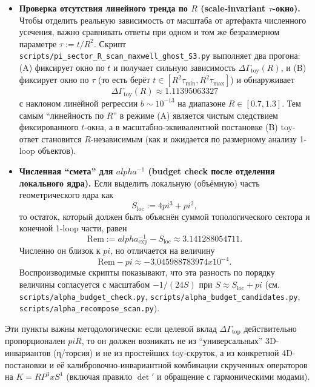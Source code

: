 \documentclass[12pt]{article}
\def\mathbb#1{#1}%
\def\alpha{alpha}%
\def\pi{pi}%
\def\times{x}%
\begin{document}
\begin{itemize}
  \item \textbf{Проверка отсутствия линейного тренда по $R$ (scale-invariant $\tau$-окно).}
  Чтобы отделить реальную зависимость от масштаба от артефакта численного усечения, важно сравнивать ответы при одном и том же безразмерном параметре $\tau:=t/R^2$.
  Скрипт \texttt{scripts/pi\_sector\_R\_scan\_maxwell\_ghost\_S3.py} выполняет два прогона:
  (A) фиксирует окно по $t$ и получает сильную зависимость $\Delta\Gamma_{\mathrm{toy}}(R)$, и
  (B) фиксирует окно по $\tau$ (то есть берёт $t\in[R^2\tau_{\min},R^2\tau_{\max}]$) и обнаруживает
  \begin{equation}
    \Delta\Gamma_{\mathrm{toy}}(R)\approx 1.11395063327
  \end{equation}
  с наклоном линейной регрессии $b\sim 10^{-13}$ на диапазоне $R\in[0.7,1.3]$.
  Тем самым ``линейность по $R$'' в режиме (A) является чистым следствием фиксированного $t$-окна, а в масштабно-эквивалентной постановке (B) toy-ответ становится $R$-независимым (как и ожидается по размерному анализу 1-loop объектов).

  \item \textbf{Численная ``смета'' для $\alpha^{-1}$ (budget check после отделения локального ядра).}
  Если выделить локальную (объёмную) часть геометрического ядра как
  \begin{equation}
    S_{\mathrm{loc}}:=4\pi^3+\pi^2, 
  \end{equation}
  то остаток, который должен быть объяснён суммой топологического сектора и конечной 1-loop части, равен
  \begin{equation}
    \mathrm{Rem}:=\alpha^{-1}_{\mathrm{exp}}-S_{\mathrm{loc}}\approx 3.141288054711.
  \end{equation}
  Численно он близок к $\pi$, но отличается на величину
  \begin{equation}
    \mathrm{Rem}-\pi\approx -3.045988783974\times 10^{-4}.
  \end{equation}
  Воспроизводимые скрипты показывают, что эта разность по порядку величины согласуется с масштабом $-1/(24S)$ при $S\approx S_{\mathrm{loc}}+\pi$ (см. \texttt{scripts/alpha\_budget\_check.py}, \texttt{scripts/alpha\_budget\_candidates.py}, \texttt{scripts/alpha\_recompose\_scan.py}).
\end{itemize}

Эти пункты важны методологически: если целевой вклад $\Delta\Gamma_{\mathrm{top}}$ действительно пропорционален $\pi R$, то он должен возникать не из ``универсальных'' 3D-инвариантов (η/торсия) и не из простейших toy-скруток, а из конкретной 4D-постановки и её калибровочно-инвариантной комбинации скрученных операторов на $K=\mathbb{RP}^3\times S^1$ (включая правило $\det'$ и обращение с гармоническими модами).
\end{document}
